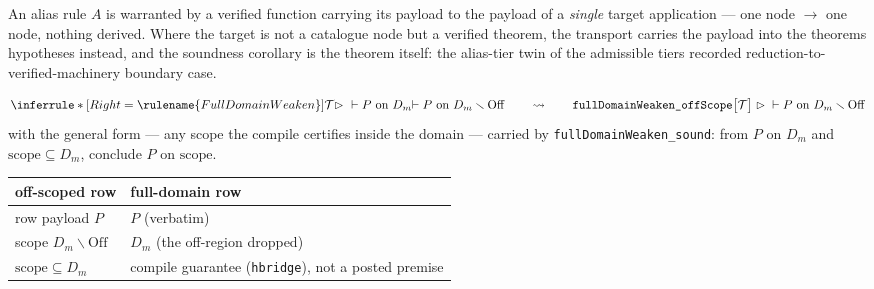 

\begin{brecipe}\label{rec:fdw-template}
An alias rule $A$ is warranted by a verified function carrying its
payload to the payload of a \emph{single} target application --- one
node $\to$ one node, nothing derived. Where the target is not a
catalogue node but a verified theorem, the transport carries the
payload into the theorem\textquotesingle s hypotheses instead, and the
soundness corollary is the theorem itself: the alias-tier twin of the
admissible tier\textquotesingle s recorded
reduction-to-verified-machinery boundary case.
\end{brecipe}

\begin{brecipe}\label{rec:fdw-filled}
\[
\inferrule*[Right=\rulename{FullDomainWeaken}]{
  \mathcal{T} \rhd\ \vdash P \ \text{on } D_m
}{
  \vdash P \ \text{on } D_m \smallsetminus \mathrm{Off}
}
\qquad\rightsquigarrow\qquad
\texttt{fullDomainWeaken\_offScope}\bigl[\mathcal{T}\bigr]
\;\rhd\; \vdash P \ \text{on } D_m \smallsetminus \mathrm{Off}
\]
with the general form --- any scope the compile certifies inside the
domain --- carried by \texttt{fullDomainWeaken\_sound}: from $P$ on
$D_m$ and $\mathrm{scope} \subseteq D_m$, conclude $P$ on
$\mathrm{scope}$.
\end{brecipe}

\begin{brecipe}\label{rec:fdw-transport}
\begin{center}\small
\begin{tabular}{@{}ll@{}}
\textbf{off-scoped row} & \textbf{full-domain row}\\
\midrule
row payload $P$ & $P$ (verbatim)\\
scope $D_m \smallsetminus \mathrm{Off}$ & $D_m$ (the off-region dropped)\\
$\mathrm{scope} \subseteq D_m$ & compile guarantee (\texttt{hbridge}), not a posted premise\\
\end{tabular}
\end{center}
\end{brecipe}

